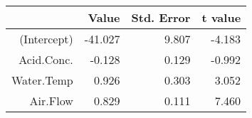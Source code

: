 \begin{table}[ht]
\centering
\begin{tabular}{rrrr}
  \hline
 & Value & Std. Error & t value \\ 
  \hline
(Intercept) & -41.027 & 9.807 & -4.183 \\ 
  Acid.Conc. & -0.128 & 0.129 & -0.992 \\ 
  Water.Temp & 0.926 & 0.303 & 3.052 \\ 
  Air.Flow & 0.829 & 0.111 & 7.460 \\ 
   \hline
\end{tabular}
\end{table}
